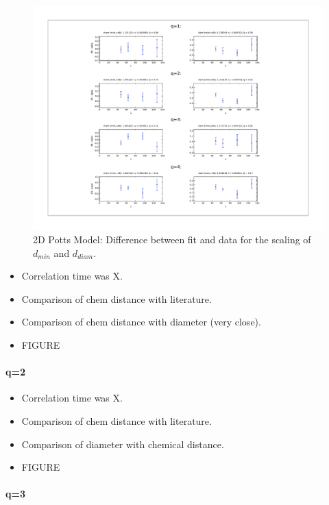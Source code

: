 \documentclass{article}
\begin{document}
\begin{figure}[htbp]
\includegraphics[width=16cm]{fig1}
\caption[]{\label{fig:fig1} 2D Potts Model: Difference between fit and data for the scaling of $d_{min}$ and $d_{diam}$.}
\end{figure}




\begin{itemize}
\item Correlation time was X.
\item Comparison of chem distance with literature.
\item Comparison of chem distance with diameter (very close).
\item FIGURE
\end{itemize}
\paragraph{q=2}
\label{sec-2.3.1.2}

\begin{itemize}
\item Correlation time was X.
\item Comparison of chem distance with literature.
\item Comparison of diameter with chemical distance.
\item FIGURE
\end{itemize}
\paragraph{q=3}
\label{sec-2.3.1.3}
\end{document}
